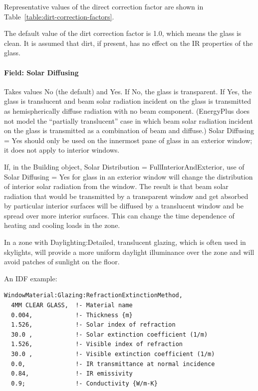 Representative values of the direct correction factor are shown in Table~\ref{table:dirt-correction-factors}.

The default value of the dirt correction factor is 1.0, which means the glass is clean. It is assumed that dirt, if present, has no effect on the IR properties of the glass.

\paragraph{Field: Solar Diffusing}\label{field-solar-diffusing-1}

Takes values No (the default) and Yes. If No, the glass is transparent. If Yes, the glass is translucent and beam solar radiation incident on the glass is transmitted as hemispherically diffuse radiation with no beam component. (EnergyPlus does not model the ``partially translucent'' case in which beam solar radiation incident on the glass is transmitted as a combination of beam and diffuse.) Solar Diffusing = Yes should only be used on the innermost pane of glass in an exterior window; it does not apply to interior windows.

If, in the Building object, Solar Distribution = FullInteriorAndExterior, use of Solar Diffusing = Yes for glass in an exterior window will change the distribution of interior solar radiation from the window. The result is that beam solar radiation that would be transmitted by a transparent window and get absorbed by particular interior surfaces will be diffused by a translucent window and be spread over more interior surfaces. This can change the time dependence of heating and cooling loads in the zone.

In a zone with Daylighting:Detailed, translucent glazing, which is often used in skylights, will provide a more uniform daylight illuminance over the zone and will avoid patches of sunlight on the floor.

An IDF example:

\begin{lstlisting}
WindowMaterial:Glazing:RefractionExtinctionMethod,
  4MM CLEAR GLASS,  !- Material name
  0.004,            !- Thickness {m}
  1.526,            !- Solar index of refraction
  30.0 ,            !- Solar extinction coefficient (1/m)
  1.526,            !- Visible index of refraction
  30.0 ,            !- Visible extinction coefficient (1/m)
  0.0,              !- IR transmittance at normal incidence
  0.84,             !- IR emissivity
  0.9;              !- Conductivity {W/m-K}
\end{lstlisting}

